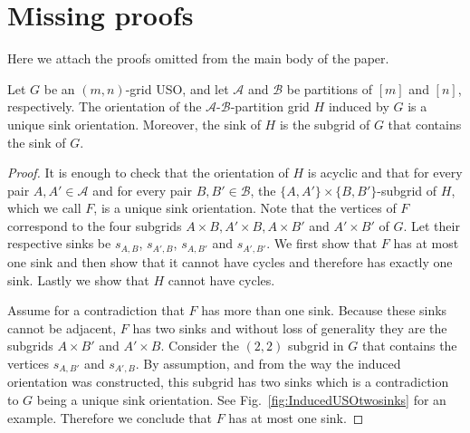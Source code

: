 \documentclass[runningheads,a4paper]{llncs}
\newcommand{\A}{\ensuremath{\mathcal A}}
\newcommand{\B}{\ensuremath{\mathcal B}}
\newcommand{\s}[1]{\ensuremath{s_{\scriptscriptstyle#1}}}
\begin{document}
\section{Missing proofs}
Here we attach the proofs omitted from the main body of the paper. 

\setcounter{lemma}{0}
\begin{lemma}
Let $G$ be an $(m,n)$-grid USO,
and let $\A$ and $\B$ be partitions of $[m]$ and $[n]$, respectively.
The orientation of the $\A$-$\B$-partition grid $H$ induced by $G$ is a unique sink orientation.
Moreover, the sink of $H$ is the subgrid of $G$ that contains the sink of $G$.
\end{lemma}
\begin{proof}
It is enough to check that the orientation of $H$ is acyclic and that for every pair $A, A'\in \A$ and for every pair $B,B'\in \B$, the 
$\{A,A'\}\times\{B, B'\}$-subgrid of $H$, which we call $F$, is a unique sink orientation.
Note that the vertices of $F$ correspond to the four subgrids $A\times B, A'\times B, A\times B'$ and $A'\times B'$ of $G$. 
Let their respective sinks be $s_{A,B}$, $s_{A',B}$, $s_{A,B'}$ and $s_{A',B'}$.
We first show that $F$ has at most one sink and then show that it cannot have cycles and therefore has exactly one sink. Lastly we show that $H$ cannot have cycles.

Assume for a contradiction that $F$ has more than one sink.
Because these sinks cannot be adjacent, $F$ has two sinks and without loss of generality they are the subgrids $A\times B'$ and $A'\times B$. Consider the $(2,2)$ subgrid in $G$ that contains the vertices $\s{A,B'}$ and $\s{A',B}$. By assumption, and from the way the induced orientation was constructed, this subgrid has two sinks which is a contradiction to $G$ being a unique sink orientation. See Fig.~\ref{fig:InducedUSOtwosinks} for an example. Therefore we conclude that $F$ has at most one sink. 


\end{proof}
\end{document}
